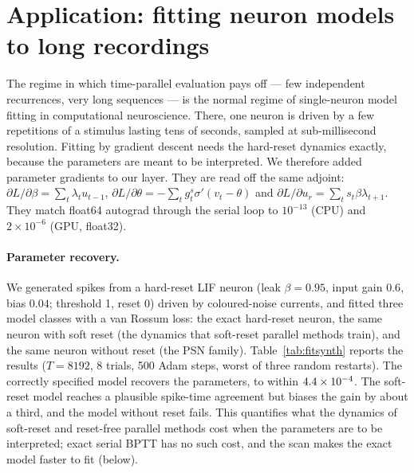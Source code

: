 \documentclass[10pt]{article}
\theoremstyle{remark}
\begin{document}
\section{Application: fitting neuron models to long recordings}
\label{sec:fit}

The regime in which time-parallel evaluation pays off --- few independent recurrences, very long sequences --- is the normal regime of single-neuron model fitting in computational neuroscience. There, one neuron is driven by a few repetitions of a stimulus lasting tens of seconds, sampled at sub-millisecond resolution. Fitting by gradient descent needs the hard-reset dynamics exactly, because the parameters are meant to be interpreted. We therefore added parameter gradients to our layer. They are read off the same adjoint: $\partial L/\partial\beta=\sum_t\lambda_tu_{t-1}$, $\partial L/\partial\theta=-\sum_tg^s_t\sigma'(v_t-\theta)$ and $\partial L/\partial u_r=\sum_ts_t\beta\lambda_{t+1}$. They match float64 autograd through the serial loop to $10^{-13}$ (CPU) and $2\times10^{-6}$ (GPU, float32).

\paragraph{Parameter recovery.}
We generated spikes from a hard-reset LIF neuron (leak $\beta=0.95$, input gain $0.6$, bias $0.04$; threshold 1, reset 0) driven by coloured-noise currents, and fitted three model classes with a van Rossum loss: the exact hard-reset neuron, the same neuron with soft reset (the dynamics that soft-reset parallel methods train), and the same neuron without reset (the PSN family). Table~\ref{tab:fitsynth} reports the results ($T=8192$, 8 trials, 500 Adam steps, worst of three random restarts). The correctly specified model recovers the parameters, to within $4.4\times10^{-4}$. The soft-reset model reaches a plausible spike-time agreement but biases the gain by about a third, and the model without reset fails. This quantifies what the dynamics of soft-reset and reset-free parallel methods cost when the parameters are to be interpreted; exact serial BPTT has no such cost, and the scan makes the exact model faster to fit (below).

\begin{table}[t]
\centering\small

\caption{Fitting a hard-reset LIF neuron (synthetic ground truth). Columns 2--4: largest relative parameter error over three restarts; last column: spike-time F1 ($\pm2$ steps) on a held-out stimulus.}
\label{tab:fitsynth}
\end{table}
\end{document}
